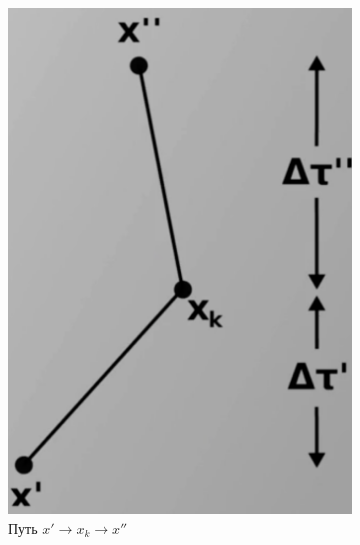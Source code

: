 \begin{lecture}
    \begin{figure}[ht]
        \begin{subfigure}{0.33\columnwidth}
            \centering\includegraphics[width=\linewidth]{fig/path-slice}
            \caption{Путь $x' \rightarrow x_k \rightarrow x''$}
            \label{fig:x_k-between-primes}
        \end{subfigure}
        \begin{subfigure}{0.33\columnwidth}

\end{subfigure}
\end{figure}
\end{lecture}
